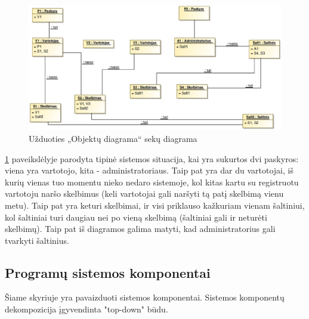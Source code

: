\documentclass[12pt]{article}
\begin{document}
	\begin{figure}[h]
		\begin{center}
			\includegraphics[width=\textwidth]{ObjektuDiagrama.eps}
			\caption{Užduoties „Objektų diagrama“ sekų diagrama\label{ObjectDiagram}}
		\end{center}
	\end{figure}
	
	\ref{ObjectDiagram} paveikslėlyje parodyta tipinė sistemos situacija, kai yra sukurtos dvi paskyros: viena yra vartotojo, kita - administratoriaus. Taip pat yra dar du vartotojai, iš kurių vienas tuo momentu nieko nedaro sistemoje, kol kitas kartu su registruotu vartotoju naršo skelbimus (keli vartotojai gali naršyti tą patį skelbimą vienu metu). Taip pat yra keturi skelbimai, ir visi priklauso kažkuriam vienam šaltiniui, kol šaltiniai turi daugiau nei po vieną skelbimą (šaltiniai gali ir neturėti skelbimų). Taip pat iš diagramos galima matyti, kad administratorius gali tvarkyti šaltinius.
	\pagebreak
	
	\subsection{Programų sistemos komponentai}
	
	Šiame skyriuje yra pavaizduoti sistemos komponentai. Sistemos komponentų dekompozicija įgyvendinta "top-down" būdu.	
	
\end{document}
